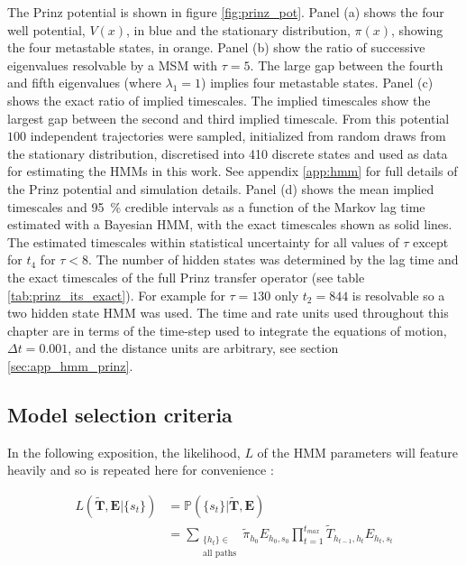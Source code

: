 The Prinz potential \cite{prinzMarkovModelsMolecular2011} is shown in figure \ref{fig:prinz_pot}.  Panel (a) shows the four well potential, $V(x)$, in blue and the stationary distribution, $\pi(x)$, showing the four metastable states, in orange. Panel (b) show the  ratio of successive eigenvalues resolvable by a  MSM with $\tau=5$. The large gap between the fourth and fifth eigenvalues (where $\lambda_1=1$) implies four metastable states. Panel (c) shows the exact ratio of implied timescales. The implied timescales show the largest gap between the second and third implied timescale. From this potential $100$ independent trajectories were sampled, initialized from random draws from the stationary distribution, discretised into 410 discrete states and used as data for estimating the HMMs in this work. See appendix \ref{app:hmm} for full details of the Prinz potential and simulation details. Panel (d) shows the mean implied timescales and \SI{95}{\percent} credible intervals as a function of the Markov lag time estimated with a Bayesian HMM, with the exact timescales shown as solid lines. The estimated timescales within statistical uncertainty for all values of $\tau$ except for $t_{4}$ for $\tau < 8$.  The number of hidden states was determined by the lag time and the exact timescales of the full Prinz transfer operator (see table \ref{tab:prinz_its_exact}). For example for $\tau = 130$ only $t_2 = 844$ is resolvable so a two hidden state HMM was used. The time and rate units used throughout this chapter are in terms of the time-step used to integrate the equations of motion, $\Delta t = 0.001$, and the distance units are arbitrary, see section \ref{sec:app_hmm_prinz}.

\subsection{Model selection criteria}

In the following exposition, the likelihood, $L$ of the HMM parameters will feature heavily and so is repeated here for convenience \cite{noeProjectedHiddenMarkov2013a}: 

\begin{equation}\label{eqn:obs_lik_full}
\begin{split}
    L(\tilde{\mathbf{T}}, \mathbf{E}| \{s_t\}) & = \mathbb{P}(\{s_t\} | \tilde{\mathbf{T}}, \mathbf{E}) \\
    & = \sum_{\substack{\{h_t\} \in \\ \text{all paths}}} \tilde{\pi}_{h_{0}}E_{ h_{0}, s_{0}}\prod_{t=1}^{t_{max}}\tilde{T}_{h_{t-1}, h_t}E_{h_t, s_t}    
\end{split}
\end{equation}

